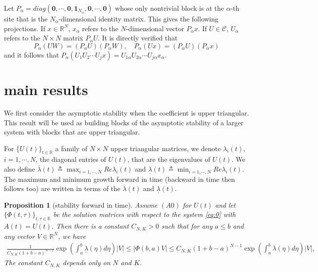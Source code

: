 \documentclass[a4paper,11pt]{article}
\newcommand{\upl}{\overline{\lambda}}
\newcommand{\udl}{\underline{\lambda}}
\newcommand{\C}{\mathcal{C}}
\newcounter{Theorem}
\newtheorem{proposition}[Theorem]{Proposition}
\theoremstyle{remark}
\begin{document}
Let $P_\alpha=diag(\mathbf{0},\cdots,\mathbf{0},\mathbf{1}_{N_\alpha},\mathbf{0},\cdots,\mathbf{0})$ whose only nontrivial block is at the $\alpha$-th site that is the $N_\alpha$-dimensional identity matrix. This gives the following projections. If $x\in \mathbb{R}^N$, $x_\alpha$ refers to the $N$-dimensional vector $P_\alpha x$. If $U\in \C$, $U_\alpha$ refers to the $N\times N$ matrix $P_\alpha U$. It is directly verified that 
$$P_\alpha (UW) = (P_\alpha U) (P_\alpha W), \quad P_\alpha (U x) = (P_\alpha U) (P_\alpha x)$$
and it follows that $P_\alpha(U_1U_2\cdots U_j x) = U_{1\alpha}U_{2\alpha}\cdots U_{j\alpha} x_\alpha.$


\section{main results}

We first consider the asymptotic stability when the coefficient is upper triangular. This result will be used as building blocks of the asymptotic stability of a larger system with blocks that are upper triangular. 

For $\{U(t)\}_{t\in \mathbb{R}}$  a family of $N\times N$ upper triangular matrices, we denote $\lambda_i(t)$, $i=1,\cdots,N$, the diagonal entries of $U(t)$, that are the eigenvalues of $U(t)$. We also define $\displaystyle\upl(t)\triangleq \max_{i=1,\cdots,N} Re \lambda_i(t)$ and $\displaystyle \udl(t)\triangleq \min_{i=1,\cdots,N} Re \lambda_i(t)$. The maximum and minimum growth forward in time (backward in time then follows too) are written in terms of the $\upl(t)$ and $\udl(t)$. 

\begin{proposition}[stability forward in time] \label{stability} Assume $(A0)$ for $U(t)$ and let $\{\Phi(t,\tau)\}_{t,\tau \in \mathbb{R}}$ be the solution matrices with respect to the system \eqref{eq:0} with $A(t)=U(t)$. Then there is a constant $C_{N,K}>0$ such that for any $a \le b$ and any vector $V \in \mathbb{R}^N$, we have
\begin{equation} \label{stabestim}
 \begin{aligned}
 \tfrac{1}{C_{N,K}(1+b-a)^{N-1}}\exp\left(\int_a^b \udl(\eta) d\eta\right)|V| \le |\Phi(b,a)V|
 \le C_{N,K}(1+b-a)^{N-1}\exp\left(\int_a^b \upl(\eta) d\eta\right)|V|,  
 \end{aligned}
\end{equation}
The constant $C_{N,K}$ depends only on $N$ and $K$. 
\end{proposition}
\end{document}
